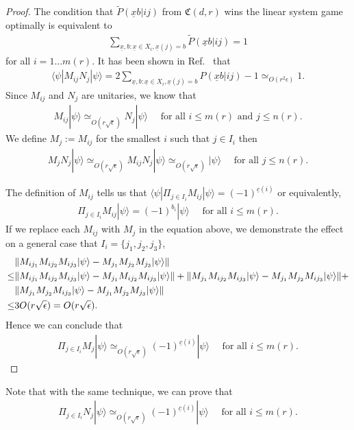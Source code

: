 \documentclass[11pt,letterpaper]{article}
\newcommand{\ket}[1]{|#1\rangle}
\newcommand{\bra}[1]{\langle#1|}
\DeclarePairedDelimiter{\norm}{\lVert}{\rVert}
\newcommand{\1}{\mathbb{1}}
\newcommand{\nr}{n(r)}
\newcommand{\mr}{m(r)}
\newcommand{\ux}{\underline{x}}
\newcommand{\uc}{\underline{c}}
\newcommand{\fC}{\mathfrak{C}}
\newcommand{\pr}[2]{P(#1|#2)}
\newcommand{\tpr}[2]{\tilde{P}(#1|#2)}
\newcommand{\ep}{\epsilon}
\newcommand{\se}{\sqrt{\epsilon}}
\newcommand{\appd}[1]{\simeq_{#1}}
\theoremstyle{definition}
\begin{document}
\begin{proof}
The condition that $\tpr{\ux b}{ij}$ from $\fC(d,r)$ wins the linear system game optimally is equivalent to
\begin{align*}
\sum_{\ux,b: \ux \in X_i, \ux(j) = b} \tpr{\ux b}{ij} = 1
\end{align*}
for all $i = 1 \dots \mr$.
It has been shown in Ref.~\cite{slofstra2017} that 
\begin{align*}
	\bra{\psi} M_{ij} N_j \ket{\psi} = 2 \sum_{\ux,b: \ux \in X_i, \ux(j) = b} \pr{\ux b}{ij} -1 \appd{O(r^2 \ep)} 1.
\end{align*}
Since $M_{ij}$ and $N_j$ are unitaries, we know that
\begin{align*}
	M_{ij} \ket{\psi} \appd{O(r\se)} N_j \ket{\psi} \quad \text{ for all } i \leq \mr \text{ and } j \leq \nr.
\end{align*}
We define $M_j := M_{ij}$ for the smallest $i$ such that $ j \in I_i$ then 
\begin{align*}
	M_j N_j \ket{\psi} \appd{O(r\se)} M_{ij}N_j\ket{\psi} \appd{O(r\se)} \ket{\psi} \quad \text{ for all } j \leq \nr.
\end{align*}

The definition of $M_{ij}$ tells us that 
$
\bra{\psi} \Pi_{j \in I_i} M_{ij} \ket{\psi} = (-1)^{\uc(i)}
$
or equivalently,
\begin{align*}
	\Pi_{j \in I_i} M_{ij} \ket{\psi} = (-1)^{b_i} \ket{\psi}\quad\text{ for all } i \leq \mr.
\end{align*}	
If we replace each $M_{ij}$ with $M_j$ in the equation above, we demonstrate the effect on a
general case that $I_i = \{j_1, j_2, j_3\}$,
\begin{align*}
	&\norm{ M_{ij_1}M_{ij_2}M_{ij_3} \ket{\psi} - M_{j_1}M_{j_2}M_{j_3} \ket{\psi}}\\
	\leq & \norm{M_{ij_1}M_{ij_2}M_{ij_3} \ket{\psi} - M_{j_1}M_{ij_2}M_{ij_3} \ket{\psi}}+
	\norm{M_{j_1}M_{ij_2}M_{ij_3} \ket{\psi} - M_{j_1}M_{j_2}M_{ij_3} \ket{\psi}} +\\
	&\norm{M_{j_1}M_{j_2}M_{ij_3} \ket{\psi} - M_{j_1}M_{j_2}M_{j_3} \ket{\psi}}\\
	\leq &3O(r\se) = O(r\se).
\end{align*}
Hence we can conclude that 
\begin{align*}
	\Pi_{j \in I_i} M_j \ket{\psi} \appd{O(r\se)} (-1)^{\uc(i)}\ket{\psi} \quad \text{ for all } i \leq \mr.
\end{align*}
\end{proof}
Note that with the same technique, we can prove that 
\begin{align*}
	\Pi_{j \in I_i} N_j \ket{\psi} \appd{O(r\se)} (-1)^{\uc(i)}\ket{\psi} \quad \text{ for all } i \leq \mr.
\end{align*}
\end{document}
